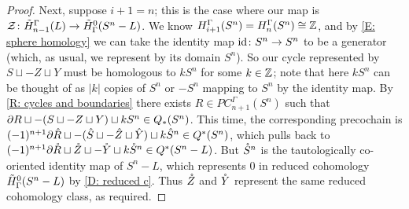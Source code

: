 \begin{proof}
	Next, suppose $i+1 = n$; this is the case where our map is $\mathcal{Z} \colon \tilde H_{n-1}^\Gamma(L) \to \tilde H^0_\Gamma(S^n - L)$.
	We know $H_{i+1}^\Gamma(S^n) = H_{n}^\Gamma(S^n) \cong \mathbb{Z}$, and by \cref{E: sphere homology} we can take the identity map $\mathrm{id} \colon S^n \to S^n$ to be a generator (which, as usual, we represent by its domain $S^n$).
	So our cycle represented by $S \sqcup -Z \sqcup Y$ must be homologous to $k S^n$ for some $k \in \mathbb{Z}$; note that here $kS^n$ can be thought of as $|k|$ copies of $S^n$ or $-S^n$ mapping to $S^n$ by the identity map.
	By \cref{R: cycles and boundaries} there exists $R \in PC_{n+1}^\Gamma(S^n)$ such that $\partial R \sqcup -(S \sqcup -Z \sqcup Y) \sqcup kS^n \in Q_*(S^n)$.
	This time, the corresponding precochain is $(-1)^{n+1}\partial \hat R \sqcup -(\hat S \sqcup -\hat Z \sqcup \hat{Y}) \sqcup k \hat S^n \in Q^*(S^n)$, which pulls back to
	$(-1)^{n+1}\partial \mathring{R} \sqcup \mathring{Z} \sqcup -\mathring{Y} \sqcup k\mathring{S}^n \in Q^*(S^n - L)$.
	But $\mathring{S}^n$ is the tautologically co-oriented identity map of $S^n - L$, which represents $0$ in reduced cohomology $\tilde H^0_\Gamma(S^n - L)$ by \cref{D: reduced c}.
	Thus $\mathring{Z}$ and $\mathring{Y}$ represent the same reduced cohomology class, as required.
\end{proof}

